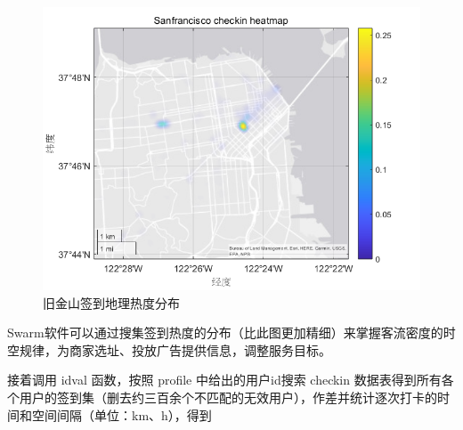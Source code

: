 \documentclass[UTF8]{ctexart}
\begin{document}
		\begin{figure}[H]
			\centering
			\includegraphics[scale=0.5]{geodense_sfo.png}
			\caption{旧金山签到地理热度分布}
			\label{geo_s}
		\end{figure}
		
		Swarm软件可以通过搜集签到热度的分布（比此图更加精细）来掌握客流密度的时空规律，为商家选址、投放广告提供信息，调整服务目标。
		
		接着调用 idval 函数，按照 profile 中给出的用户id搜索 checkin 数据表得到所有各个用户的签到集（删去约三百余个不匹配的无效用户），作差并统计逐次打卡的时间和空间间隔（单位：km、h），得到
		
\end{document}
